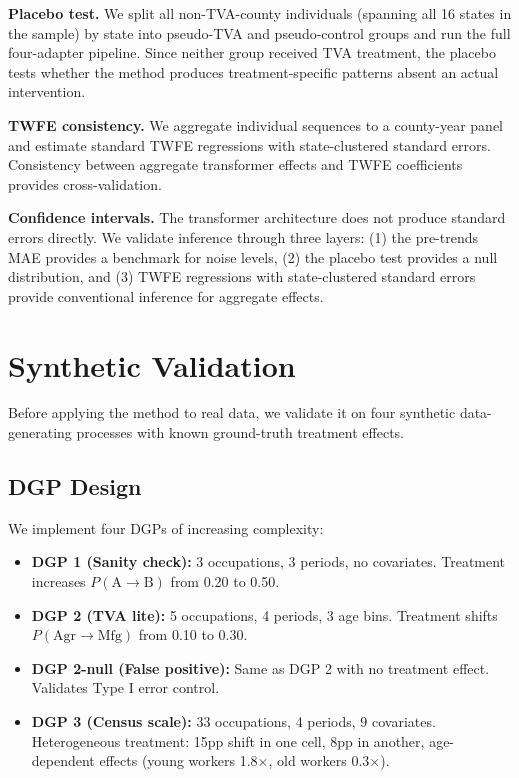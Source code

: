\documentclass[12pt]{article}
\begin{document}
\textbf{Placebo test.} We split all non-TVA-county individuals (spanning all 16 states in the sample) by state into pseudo-TVA and pseudo-control groups and run the full four-adapter pipeline. Since neither group received TVA treatment, the placebo tests whether the method produces treatment-specific patterns absent an actual intervention.

\textbf{TWFE consistency.} We aggregate individual sequences to a county-year panel and estimate standard TWFE regressions with state-clustered standard errors. Consistency between aggregate transformer effects and TWFE coefficients provides cross-validation.

\textbf{Confidence intervals.} The transformer architecture does not produce standard errors directly. We validate inference through three layers: (1) the pre-trends MAE provides a benchmark for noise levels, (2) the placebo test provides a null distribution, and (3) TWFE regressions with state-clustered standard errors provide conventional inference for aggregate effects.


\section{Synthetic Validation}
\label{sec:validation}

Before applying the method to real data, we validate it on four synthetic data-generating processes with known ground-truth treatment effects.

\subsection{DGP Design}

We implement four DGPs of increasing complexity:

\begin{itemize}
    \item \textbf{DGP 1 (Sanity check):} 3 occupations, 3 periods, no covariates. Treatment increases $P(\text{A} \to \text{B})$ from 0.20 to 0.50.
    \item \textbf{DGP 2 (TVA lite):} 5 occupations, 4 periods, 3 age bins. Treatment shifts $P(\text{Agr} \to \text{Mfg})$ from 0.10 to 0.30.
    \item \textbf{DGP 2-null (False positive):} Same as DGP 2 with no treatment effect. Validates Type I error control.
    \item \textbf{DGP 3 (Census scale):} 33 occupations, 4 periods, 9 covariates. Heterogeneous treatment: 15pp shift in one cell, 8pp in another, age-dependent effects (young workers 1.8$\times$, old workers 0.3$\times$).
\end{itemize}
\end{document}
